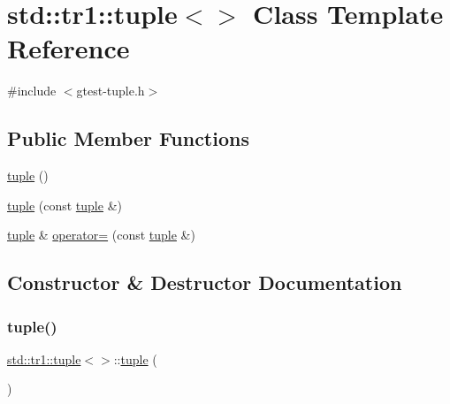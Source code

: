 \hypertarget{classstd_1_1tr1_1_1tuple_3_4}{}\section{std\+::tr1\+::tuple$<$$>$ Class Template Reference}
\label{classstd_1_1tr1_1_1tuple_3_4}


{\ttfamily \#include $<$gtest-\/tuple.\+h$>$}

\subsection*{Public Member Functions}
\begin{DoxyCompactItemize}
\item 
\mbox{\hyperlink{classstd_1_1tr1_1_1tuple_3_4_adcea1a41d0521157971339d279aad469}{tuple}} ()
\item 
\mbox{\hyperlink{classstd_1_1tr1_1_1tuple_3_4_aa857599acb126134e29dc5e53fd9d1a7}{tuple}} (const \mbox{\hyperlink{classstd_1_1tr1_1_1tuple}{tuple}} \&)
\item 
\mbox{\hyperlink{classstd_1_1tr1_1_1tuple}{tuple}} \& \mbox{\hyperlink{classstd_1_1tr1_1_1tuple_3_4_a93ddab6f662662fc49635608619150c8}{operator=}} (const \mbox{\hyperlink{classstd_1_1tr1_1_1tuple}{tuple}} \&)
\end{DoxyCompactItemize}


\subsection{Constructor \& Destructor Documentation}
\mbox{\label{classstd_1_1tr1_1_1tuple_3_4_adcea1a41d0521157971339d279aad469}} 
\subsubsection{\texorpdfstring{tuple()}{tuple()}\hspace{0.1cm}{\footnotesize\ttfamily [1/2]}}
{\footnotesize\ttfamily \mbox{\hyperlink{classstd_1_1tr1_1_1tuple}{std\+::tr1\+::tuple}}$<$$>$\+::\mbox{\hyperlink{classstd_1_1tr1_1_1tuple}{tuple}} (\begin{DoxyParamCaption}{ }\end{DoxyParamCaption})\hspace{0.3cm}{\ttfamily [inline]}}

